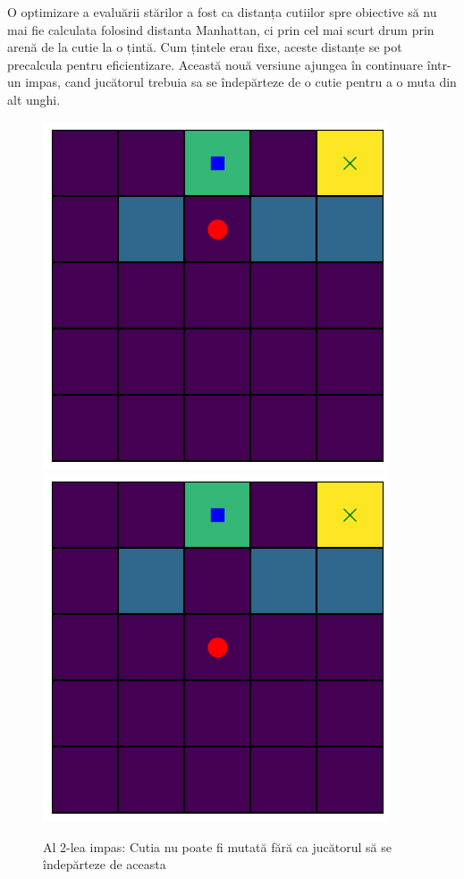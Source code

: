 \documentclass{article}
\begin{document}
O optimizare a evaluării stărilor a fost ca distanța cutiilor spre obiective să 
nu mai fie calculata folosind distanta Manhattan, ci prin cel mai scurt drum 
prin arenă de la cutie la o țintă. Cum țintele erau fixe, aceste distanțe se pot
precalcula pentru eficientizare. Această nouă versiune ajungea în continuare 
într-un impas, cand jucătorul trebuia sa se îndepărteze de o cutie pentru a o 
muta din alt unghi.
\begin{figure}[ht]
    \includegraphics[scale=0.4]{a2}
    \includegraphics[scale=0.4]{b2}
    \caption{Al 2-lea impas: Cutia nu poate fi mutată fără ca jucătorul să se 
    îndepărteze de aceasta}
\end{figure}
\end{document}
